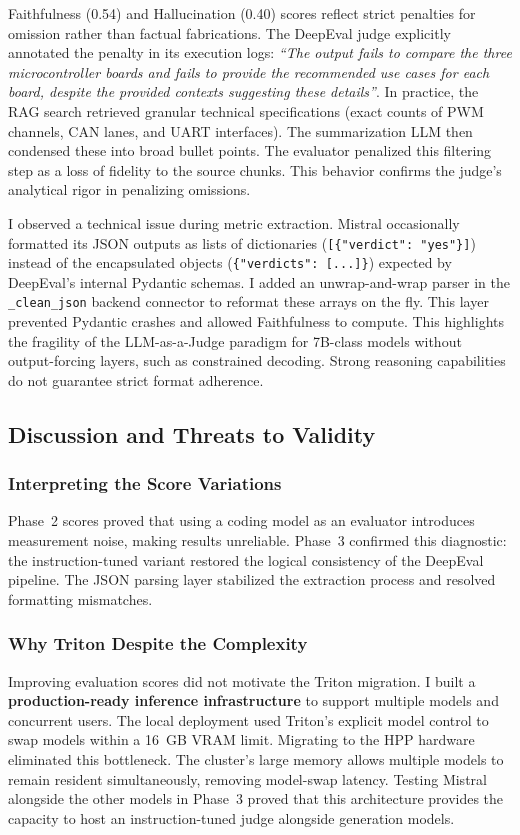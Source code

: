 Faithfulness (0.54) and Hallucination (0.40) scores reflect strict penalties for omission rather than factual fabrications. The DeepEval judge explicitly annotated the penalty in its execution logs: \textit{``The output fails to compare the three microcontroller boards and fails to provide the recommended use cases for each board, despite the provided contexts suggesting these details''}. In practice, the RAG search retrieved granular technical specifications (exact counts of PWM channels, CAN lanes, and UART interfaces). The summarization LLM then condensed these into broad bullet points. The evaluator penalized this filtering step as a loss of fidelity to the source chunks. This behavior confirms the judge's analytical rigor in penalizing omissions.

I observed a technical issue during metric extraction. Mistral occasionally formatted its JSON outputs as lists of dictionaries (\texttt{[\{"verdict":~"yes"\}]}) instead of the encapsulated objects (\texttt{\{"verdicts":~[...]\}}) expected by DeepEval's internal Pydantic schemas. I added an unwrap-and-wrap parser in the \texttt{\_clean\_json} backend connector to reformat these arrays on the fly. This layer prevented Pydantic crashes and allowed Faithfulness to compute. This highlights the fragility of the LLM-as-a-Judge paradigm for 7B-class models without output-forcing layers, such as constrained decoding. Strong reasoning capabilities do not guarantee strict format adherence.

\subsection{Discussion and Threats to Validity}

\subsubsection{Interpreting the Score Variations}
Phase~2 scores proved that using a coding model as an evaluator introduces measurement noise, making results unreliable. Phase~3 confirmed this diagnostic: the instruction-tuned variant restored the logical consistency of the DeepEval pipeline. The JSON parsing layer stabilized the extraction process and resolved formatting mismatches.

\subsubsection{Why Triton Despite the Complexity}
Improving evaluation scores did not motivate the Triton migration. I built a \textbf{production-ready inference infrastructure} to support multiple models and concurrent users. The local deployment used Triton's explicit model control to swap models within a 16~GB VRAM limit. Migrating to the HPP hardware eliminated this bottleneck. The cluster's large memory allows multiple models to remain resident simultaneously, removing model-swap latency. Testing Mistral alongside the other models in Phase~3 proved that this architecture provides the capacity to host an instruction-tuned judge alongside generation models.

